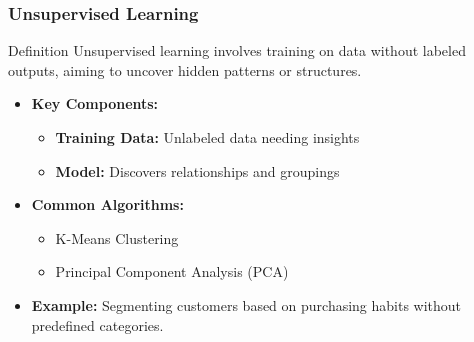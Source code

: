 \documentclass{beamer}
\begin{document}
\begin{frame}[fragile]
    \frametitle{Unsupervised Learning}
    \begin{block}{Definition}
        Unsupervised learning involves training on data without labeled outputs, aiming to uncover hidden patterns or structures.
    \end{block}
    
    \begin{itemize}
        \item \textbf{Key Components:}
            \begin{itemize}
                \item \textbf{Training Data:} Unlabeled data needing insights
                \item \textbf{Model:} Discovers relationships and groupings
            \end{itemize}
        
        \item \textbf{Common Algorithms:}
            \begin{itemize}
                \item K-Means Clustering
                \item Principal Component Analysis (PCA)
            \end{itemize}
        
        \item \textbf{Example:} Segmenting customers based on purchasing habits without predefined categories.
    \end{itemize}
\end{frame}
\end{document}
